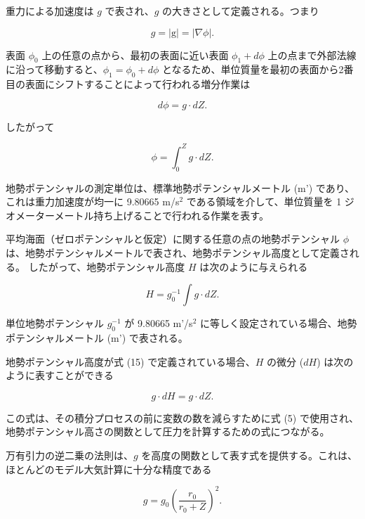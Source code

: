 \documentclass{article}
\begin{document}
重力による加速度は $g$ で表され、$g$ の大きさとして定義される。つまり

\begin{equation}
 g = |\text{g}| = |\nabla \phi|. \tag{12}
\end{equation}

表面 $\phi_0$ 上の任意の点から、最初の表面に近い表面 $\phi_1+d\phi$ 上の点まで外部法線に沿って移動すると、$\phi_1 = \phi_0 + d\phi$ となるため、単位質量を最初の表面から2番目の表面にシフトすることによって行われる増分作業は

\begin{equation}
 d\phi = g \cdot dZ. \tag{13}
\end{equation}

したがって

\begin{equation}
 \phi = \int_{0}^{Z} g \cdot dZ . \tag{14}
\end{equation}

地勢ポテンシャルの測定単位は、標準地勢ポテンシャルメートル (m') であり、これは重力加速度が均一に 9.80665 m/s$^2$ である領域を介して、単位質量を 1 ジオメーターメートル持ち上げることで行われる作業を表す。

平均海面（ゼロポテンシャルと仮定）に関する任意の点の地勢ポテンシャル $\phi$ は、地勢ポテンシャルメートルで表され、地勢ポテンシャル高度として定義される。
したがって、地勢ポテンシャル高度 $H$ は次のように与えられる

\begin{equation}
 H = g_0^{-1} \int g \cdot dZ. \tag{15}
\end{equation}

単位地勢ポテンシャル $g_0^{-1}$ が 9.80665 m'/s$^2$ に等しく設定されている場合、地勢ポテンシャルメートル (m') で表される。

地勢ポテンシャル高度が式 (15) で定義されている場合、$H$ の微分 ($dH$) は次のように表すことができる

\begin{equation}
 g\cdot dH = g\cdot dZ. \tag{16}
\end{equation}

この式は、その積分プロセスの前に変数の数を減らすために式 (5) で使用され、地勢ポテンシャル高さの関数として圧力を計算するための式につながる。

万有引力の逆二乗の法則は、$g$ を高度の関数として表す式を提供する。これは、ほとんどのモデル大気計算に十分な精度である

\begin{equation}
 g = g_0 \left( \frac{r_0}{r_0 + Z} \right)^2. \tag{17}
\end{equation}
\end{document}
